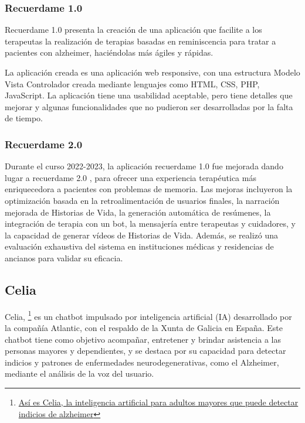 \subsubsection{Recuerdame 1.0}
Recuerdame 1.0 \citep{recuerdame1.0} presenta la creación de una aplicación que facilite a los terapeutas la realización de terapias basadas en reminiscencia para tratar a pacientes con alzheimer, haciéndolas más ágiles y rápidas.

La aplicación creada es una aplicación web responsive, con una estructura Modelo Vista Controlador creada mediante lenguajes como HTML, CSS, PHP, JavaScript. La aplicación tiene una usabilidad aceptable, pero tiene detalles que mejorar y algunas funcionalidades que no pudieron ser desarrolladas por la falta de tiempo. 

\subsubsection{Recuerdame 2.0}
Durante el curso 2022-2023, la aplicación recuerdame 1.0 fue mejorada dando lugar a recuerdame 2.0 \citep{recuerdame2.0}, para ofrecer una experiencia terapéutica más enriquecedora a pacientes con problemas de memoria. Las mejoras incluyeron la optimización basada en la retroalimentación de usuarios finales, la narración mejorada de Historias de Vida, la generación automática de resúmenes, la integración de terapia con un bot, la mensajería entre terapeutas y cuidadores, y la capacidad de generar vídeos de Historias de Vida. Además, se realizó una evaluación exhaustiva del sistema en instituciones médicas y residencias de ancianos para validar su eficacia.

\subsection{Celia}

Celia, \footnote{\href{https://www.ambito.com/tecnologia/asi-es-celia-la-inteligencia-artificial-adultos-mayores-que-puede-detectar-indicios-alzheimer-n5921639}{Así es Celia, la inteligencia artificial para adultos mayores que puede detectar indicios de alzheimer}} es un chatbot impulsado por inteligencia artificial (IA) desarrollado por la compañía Atlantic, con el respaldo de la Xunta de Galicia en España. Este chatbot tiene como objetivo acompañar, entretener y brindar asistencia a las personas mayores y dependientes, y se destaca por su capacidad para detectar indicios y patrones de enfermedades neurodegenerativas, como el Alzheimer, mediante el análisis de la voz del usuario.

